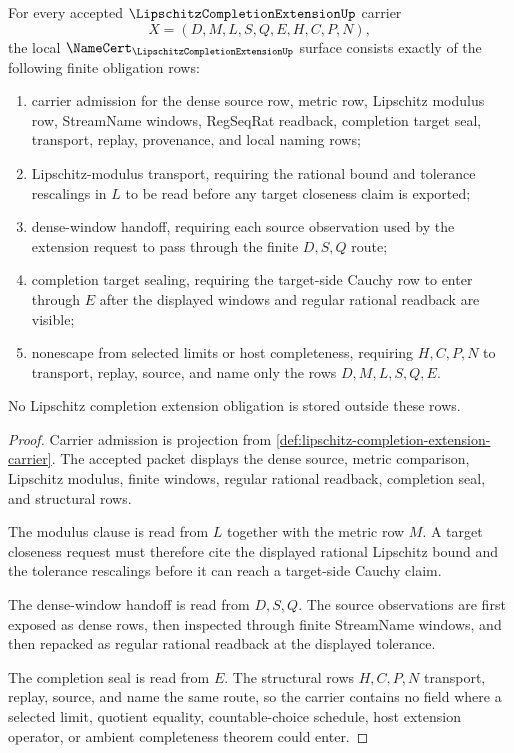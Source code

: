 \begin{theorem}
\label{thm:lipschitz-completion-extension-namecert-obligations}
For every accepted $\LipschitzCompletionExtensionUp$ carrier
$$
X=(D,M,L,S,Q,E,H,C,P,N),
$$
the local $\NameCert_{\LipschitzCompletionExtensionUp}$ surface consists exactly of the following finite obligation rows:
\begin{enumerate}
\item carrier admission for the dense source row, metric row, Lipschitz modulus row, StreamName windows, RegSeqRat readback, completion target seal, transport, replay, provenance, and local naming rows;
\item Lipschitz-modulus transport, requiring the rational bound and tolerance rescalings in $L$ to be read before any target closeness claim is exported;
\item dense-window handoff, requiring each source observation used by the extension request to pass through the finite $D,S,Q$ route;
\item completion target sealing, requiring the target-side Cauchy row to enter through $E$ after the displayed windows and regular rational readback are visible;
\item nonescape from selected limits or host completeness, requiring $H,C,P,N$ to transport, replay, source, and name only the rows $D,M,L,S,Q,E$.
\end{enumerate}
No Lipschitz completion extension obligation is stored outside these rows.
\end{theorem}
\begin{proof}
Carrier admission is projection from \autoref{def:lipschitz-completion-extension-carrier}. The accepted packet displays the dense source, metric comparison, Lipschitz modulus, finite windows, regular rational readback, completion seal, and structural rows.

The modulus clause is read from $L$ together with the metric row $M$. A target closeness request must therefore cite the displayed rational Lipschitz bound and the tolerance rescalings before it can reach a target-side Cauchy claim.

The dense-window handoff is read from $D,S,Q$. The source observations are first exposed as dense rows, then inspected through finite StreamName windows, and then repacked as regular rational readback at the displayed tolerance.

The completion seal is read from $E$. The structural rows $H,C,P,N$ transport, replay, source, and name the same route, so the carrier contains no field where a selected limit, quotient equality, countable-choice schedule, host extension operator, or ambient completeness theorem could enter.
\end{proof}

